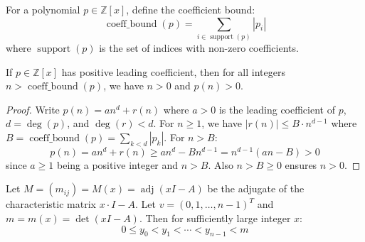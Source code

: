 \begin{definition}
\label{def:coeff_bound}
\leanok
For a polynomial $p \in \mathbb{Z}[x]$, define the coefficient bound:
$$\operatorname{coeff\_bound}(p) = \sum_{i \in \operatorname{support}(p)} |p_i|$$
where $\operatorname{support}(p)$ is the set of indices with non-zero coefficients.
\end{definition}

\begin{lemma}
\label{lem:polynomial_positive}
\leanok
If $p \in \mathbb{Z}[x]$ has positive leading coefficient, then for all integers $n > \operatorname{coeff\_bound}(p)$, we have $n > 0$ and $p(n) > 0$.
\end{lemma}

\begin{proof}
Write $p(n) = an^d + r(n)$ where $a > 0$ is the leading coefficient of $p$, $d = \deg(p)$, and $\deg(r) < d$.
For $n \geq 1$, we have $|r(n)| \leq B \cdot n^{d-1}$ where $B = \operatorname{coeff\_bound}(p) = \sum_{k < d} |p_k|$.
For $n > B$:
$$p(n) = an^d + r(n) \geq an^d - Bn^{d-1} = n^{d-1}(an - B) > 0$$
since $a \geq 1$ being a positive integer and $n > B$. Also $n > B \geq 0$ ensures $n > 0$.
\end{proof}

\begin{lemma}
\label{lem:adj_poly_strict_increasing}
Let $M = (m_{ij}) = M(x) = \operatorname{adj}(x I - A)$ be the adjugate of the characteristic matrix $x\cdot I - A$.
Let $v = (0,1,\ldots,n-1)^T$ and $m = m(x) = \det(x I - A)$. Then for sufficiently large integer $x$:
$$0 \le y_0 < y_1 < \cdots < y_{n-1} < m$$
\end{lemma}

